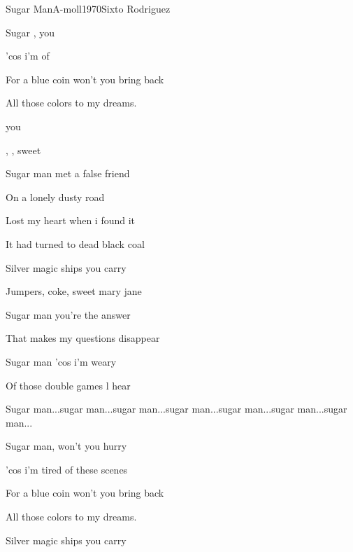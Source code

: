\begin{song}{Sugar Man}{A-moll}{1970}{Sixto Rodriguez}{}{}
  \begin{SBVerse}
    Sugar ,  you  

    'cos i'm  of  

    For a blue coin won't you bring back

    All those colors to my dreams.
  \end{SBVerse}

  \begin{SBChorus}
       you 

    , , sweet   
  \end{SBChorus}

  \begin{SBVerse}
    Sugar man met a false friend

    On a lonely dusty road

    Lost my heart when i found it

    It had turned to dead black coal
  \end{SBVerse}

  \begin{SBChorus}
    Silver magic ships you carry

    Jumpers, coke, sweet mary jane
  \end{SBChorus}

  \begin{SBVerse}
    Sugar man you're the answer

    That makes my questions disappear

    Sugar man 'cos i'm weary

    Of those double games l hear
  \end{SBVerse}

  Sugar man...sugar man...sugar man...sugar man...sugar man...sugar man...sugar man...

  \begin{SBVerse}
    Sugar man, won't you hurry

    'cos i'm tired of these scenes

    For a blue coin won't you bring back

    All those colors to my dreams.
  \end{SBVerse}

  \begin{SBChorus}
    Silver magic ships you carry


\end{SBChorus}
\end{song}
